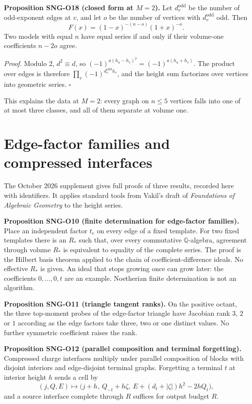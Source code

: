 \documentclass[
  11pt,
  a4paper,
]{report}
\let\singularitytexttt\texttt
\renewcommand{\texttt}[1]{\singularitytexttt{\seqsplit{#1}}}
\begin{document}
\textbf{Proposition SNG-O18 (closed form at \(M=2\)).} Let
\(d^{\mathrm{odd}}_v\) be the number of odd-exponent edges at \(v\), and
let \(o\) be the number of vertices with \(d^{\mathrm{odd}}_v\) odd.
Then \[
F(x)=(1-x)^{-(n-o)}(1+x)^{-o}.
\] Two models with equal \(n\) have equal series if and only if their
volume-one coefficients \(n-2o\) agree.

\emph{Proof.} Modulo \(2\), \(d^2\equiv d\), so
\((-1)^{a(h_u-h_v)^2}=(-1)^{a(h_u+h_v)}\). The product over edges is
therefore \(\prod_v(-1)^{d^{\mathrm{odd}}_vh_v}\), and the height sum
factorizes over vertices into geometric series. \(\square\)

This explains the data at \(M=2\): every graph on \(n\le5\) vertices
falls into one of at most three classes, and all of them separate at
volume one.

\hypertarget{edge-factor-families-and-compressed-interfaces}{%
\section{Edge-factor families and compressed
interfaces}\label{edge-factor-families-and-compressed-interfaces}}

The October 2026 supplement \texttt{docs/research/VAKIL\_BRIDGES.md}
gives full proofs of three results, recorded here with identifiers. It
applies standard tools from Vakil's draft of \emph{Foundations of
Algebraic Geometry} to the height series.

\textbf{Proposition SNG-O10 (finite determination for edge-factor
families).} Place an independent factor \(t_e\) on every edge of a fixed
template. For two fixed templates there is an \(R_*\) such that, over
every commutative \(\mathbb Q\)-algebra, agreement through volume
\(R_*\) is equivalent to equality of the complete series. The proof is
the Hilbert basis theorem applied to the chain of coefficient-difference
ideals. No effective \(R_*\) is given. An ideal that stops growing once
can grow later: the coefficients \(0,\ldots,0,t\) are an example.
Noetherian finite determination is not an algorithm.

\textbf{Proposition SNG-O11 (triangle tangent ranks).} On the positive
octant, the three top-moment probes of the edge-factor triangle have
Jacobian rank \(3\), \(2\) or \(1\) according as the edge factors take
three, two or one distinct values. No further symmetric coefficient
raises the rank.

\textbf{Proposition SNG-O12 (parallel composition and terminal
forgetting).} Compressed charge interfaces multiply under parallel
composition of blocks with disjoint interiors and edge-disjoint terminal
graphs. Forgetting a terminal \(t\) at interior height \(h\) sends a
cell by \[
(j,Q,E)\mapsto\bigl(j+h,\ Q_{-t}+h\zeta,\ E+(d_t+|\zeta|)h^2-2hQ_t\bigr),
\] and a source interface complete through \(R\) suffices for output
budget \(R\).
\end{document}
